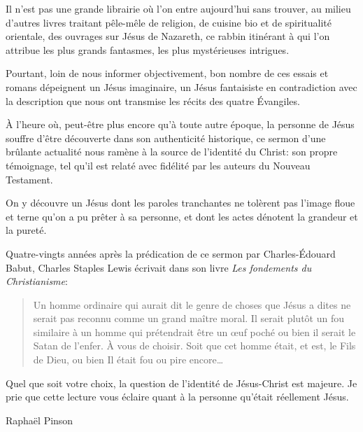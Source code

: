 
\begin{preface}
Il n'est pas une grande librairie où l'on entre aujourd'hui sans trouver,
au milieu d'autres livres traitant pêle-mêle de religion, de cuisine bio et de spiritualité orientale,
des ouvrages sur Jésus de Nazareth, ce rabbin itinérant à qui l'on attribue les plus grands
fantasmes, les plus mystérieuses intrigues.

Pourtant, loin de nous informer objectivement, bon nombre de ces essais et romans
dépeignent un Jésus imaginaire, un Jésus fantaisiste en contradiction avec
la description que nous ont transmise les récits des quatre \'Evangiles.

\`A l'heure où, peut-être plus encore qu'à toute autre époque, la personne de Jésus
souffre d'être découverte dans son authenticité historique, ce sermon d'une brûlante actualité
nous ramène à la source de l'identité du Christ: son propre témoignage,
tel qu'il est relaté avec fidélité par les auteurs du Nouveau Testament.

On y découvre un Jésus dont les paroles tranchantes ne tolèrent pas l'image
floue et terne qu'on a pu prêter à sa personne,
et dont les actes dénotent la grandeur et la pureté.

Quatre-vingts années après la prédication de ce sermon par Charles-\'Edouard Babut, Charles Staples Lewis
écrivait dans son livre \emph{Les fondements du Christianisme}:

\begin{quote}
\quotefont
Un homme ordinaire qui aurait dit le genre de choses que Jésus
a dites ne serait pas reconnu comme un grand maître moral.
Il serait plutôt un fou \ocadr similaire à un homme qui prétendrait être un œuf poché \fcadr ou bien il serait le Satan de l'enfer.
À vous de choisir. Soit que cet homme était, et est, le Fils de Dieu, ou bien Il était fou ou pire encore…
\end{quote}


Quel que soit votre choix, la question de l'identité de Jésus-Christ est majeure. Je prie que cette lecture vous éclaire quant à la personne qu'était réellement Jésus.


\begin{flushright}
Raphaël Pinson
\end{flushright}

\end{preface}


